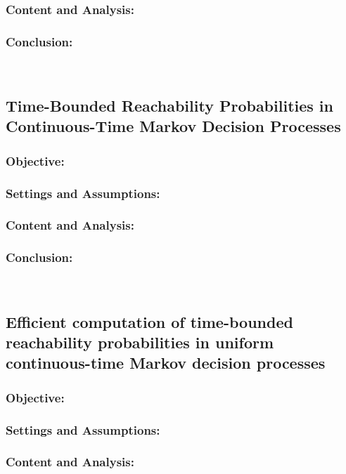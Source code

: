 \documentclass{article}
\theoremstyle{definition}
\begin{document}
\subsubsection{Content and Analysis:}

\subsubsection{Conclusion:}


\\
\subsection{Time-Bounded Reachability Probabilities in Continuous-Time Markov Decision Processes}
\subsubsection{Objective:}

\subsubsection{Settings and Assumptions:}

\subsubsection{Content and Analysis:}

\subsubsection{Conclusion:}

\\
\subsection{Efficient
computation of time-bounded reachability probabilities in uniform
continuous-time Markov decision processes}
\subsubsection{Objective:}

\subsubsection{Settings and Assumptions:}

\subsubsection{Content and Analysis:}
\end{document}
